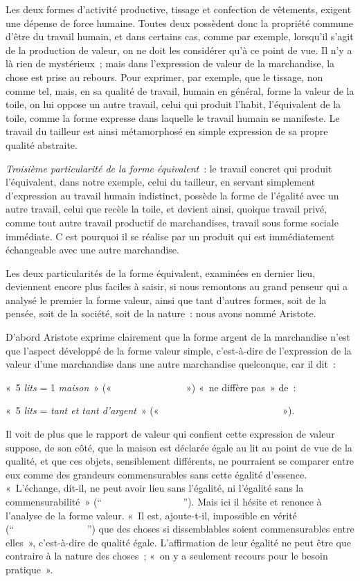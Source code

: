 \documentclass[french,twoside]{book} %
\begin{document}
Les deux formes d’activité productive, tissage et confection de vêtements, exigent une dépense de force humaine. Toutes deux possèdent donc la propriété commune d’être du travail humain, et dans certains cas, comme par exemple, lorsqu’il s’agit de la production de valeur, on ne doit les considérer qu’à ce point de vue. Il n’y a là rien de mystérieux ; mais dans l’expression de valeur de la marchandise, la chose est prise au rebours. Pour exprimer, par exemple, que le tissage, non comme tel, mais, en sa qualité de travail, humain en général, forme la valeur de la toile, on lui oppose un autre travail, celui qui produit l’habit, l’équivalent de la toile, comme la forme expresse dans laquelle le travail humain se manifeste. Le travail du tailleur est ainsi métamorphosé en simple expression de sa propre qualité abstraite.\par
\emph{Troisième particularité de la forme équivalent} : le travail concret qui produit l’équivalent, dans notre exemple, celui du tailleur, en servant simplement d’expression au travail humain indistinct, possède la forme de l’égalité avec un autre travail, celui que recèle la toile, et devient ainsi, quoique travail privé, comme tout autre travail productif de marchandises, travail sous forme sociale immédiate. C est pourquoi il se réalise par un produit qui est immédiatement échangeable avec une autre marchandise.\par
Les deux particularités de la forme équivalent, examinées en dernier lieu, deviennent encore plus faciles à saisir, si nous remontons au grand penseur qui a analysé le premier la forme valeur, ainsi que tant d’autres formes, soit de la pensée, soit de la société, soit de la nature : nous avons nommé Aristote.\par
D’abord Aristote exprime clairement que la forme argent de la marchandise n’est que l’aspect développé de la forme valeur simple, c’est-à-dire de l’expression de la valeur d’une marchandise dans une autre marchandise quelconque, car il dit :\par
« 5 \emph{lits} = 1 \emph{maison} » («  ») « ne diffère pas » de :\par
« 5 \emph{lits} = \emph{tant et tant d’argent} » («  »).\par
Il voit de plus que le rapport de valeur qui confient cette expression de valeur suppose, de son côté, que la maison est déclarée égale au lit au point de vue de la qualité, et que ces objets, sensiblement différents, ne pourraient se comparer entre eux comme des grandeurs commensurables sans cette égalité d’essence. « L’échange, dit-il, ne peut avoir lieu sans l’égalité, ni l’égalité sans la commensurabilité » (“”). Mais ici il hésite et renonce à l’analyse de la forme valeur. « Il est, ajoute-t-il, impossible en vérité (“”) que des choses si dissemblables soient commensurables entre elles », c’est-à-dire de qualité égale. L’affirmation de leur égalité ne peut être que contraire à la nature des choses ; « on y a seulement recours pour le besoin pratique ».\par
\end{document}
